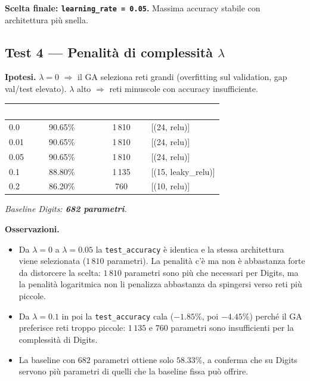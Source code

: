 \documentclass[11pt,a4paper]{article}
\newcommand{\fnt}{\texttt}     %
\begin{document}
\textbf{Scelta finale: \fnt{learning\_rate = 0.05}.} Massima accuracy
stabile con architettura più snella.

\subsection{Test 4 — Penalità di complessità $\lambda$}

\textbf{Ipotesi.} $\lambda = 0$ $\Rightarrow$ il GA seleziona reti grandi
(overfitting sul validation, gap val/test elevato). $\lambda$ alto
$\Rightarrow$ reti minuscole con accuracy insufficiente.

\begin{center}
\begin{tabular}{lccl}
    \toprule
    \rowcolor{headerblue}
    \textcolor{white}{\textbf{$\lambda$}} &
    \textcolor{white}{\textbf{test\_accuracy}} &
    \textcolor{white}{\textbf{n\_params}} &
    \textcolor{white}{\textbf{architettura}} \\
    \midrule
    0.0  & 90.65\%  & 1\,810   & [(24, relu)]            \\
    \rowcolor{rowgray}
    0.01 & 90.65\%  & 1\,810   & [(24, relu)]            \\
    0.05 & 90.65\%  & 1\,810   & [(24, relu)]            \\
    \rowcolor{rowgray}
    0.1  & 88.80\%  & 1\,135   & [(15, leaky\_relu)]     \\
    0.2  & 86.20\%  &   760    & [(10, relu)]            \\
    \bottomrule
\end{tabular}
\end{center}

\textit{Baseline Digits: \textbf{682 parametri}.}

\textbf{Osservazioni.}
\begin{itemize}
    \item Da $\lambda = 0$ a $\lambda = 0.05$ la \texttt{test\_accuracy}
          è identica e la stessa architettura viene selezionata ($1\,810$
          parametri). La penalità c'è ma non è abbastanza forte da
          distorcere la scelta: $1\,810$ parametri sono più che necessari
          per Digits, ma la penalità logaritmica non li penalizza
          abbastanza da spingersi verso reti più piccole.
    \item Da $\lambda = 0.1$ in poi la \texttt{test\_accuracy} cala
          ($-1.85\%$, poi $-4.45\%$) perché il GA preferisce reti troppo
          piccole: $1\,135$ e $760$ parametri sono insufficienti per la
          complessità di Digits.
    \item La baseline con $682$ parametri ottiene solo $58.33\%$, a
          conferma che su Digits servono più parametri di quelli che la
          baseline fissa può offrire.
\end{itemize}
\end{document}
